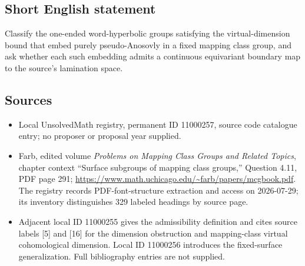 \documentclass[11pt]{article}
\begin{document}
\subsection{Short English statement}
Classify the one-ended word-hyperbolic groups satisfying the virtual-dimension bound that embed purely pseudo-Anosovly in a fixed mapping class group, and ask whether each such embedding admits a continuous equivariant boundary map to the source's lamination space.
\subsection{Sources}
\begin{itemize}
\item Local UnsolvedMath registry, permanent ID 11000257, source code catalogue entry; no proposer or proposal year supplied.
\item Farb, edited volume \emph{Problems on Mapping Class Groups and Related Topics}, chapter context ``Surface subgroups of mapping class groups,'' Question 4.11, PDF page 291; \url{https://www.math.uchicago.edu/~farb/papers/mcgbook.pdf}. The registry records PDF-font-structure extraction and access on 2026-07-29; its inventory distinguishes 329 labeled headings by source page.
\item Adjacent local ID 11000255 gives the admissibility definition and cites source labels [5] and [16] for the dimension obstruction and mapping-class virtual cohomological dimension. Local ID 11000256 introduces the fixed-surface generalization. Full bibliography entries are not supplied.
\end{itemize}
\end{document}
